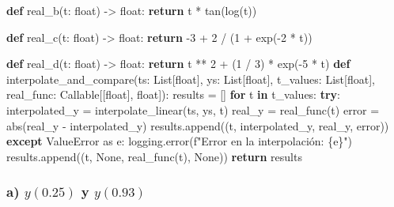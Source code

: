 \documentclass[
  letterpaper,
  DIV=11,
  numbers=noendperiod]{scrartcl}
\newenvironment{Shaded}{\begin{snugshade}}{\end{snugshade}}
\newcommand{\BuiltInTok}[1]{\textcolor[rgb]{0.00,0.23,0.31}{#1}}
\newcommand{\ControlFlowTok}[1]{\textcolor[rgb]{0.00,0.23,0.31}{\textbf{#1}}}
\newcommand{\DecValTok}[1]{\textcolor[rgb]{0.68,0.00,0.00}{#1}}
\newcommand{\ImportTok}[1]{\textcolor[rgb]{0.00,0.46,0.62}{#1}}
\newcommand{\KeywordTok}[1]{\textcolor[rgb]{0.00,0.23,0.31}{\textbf{#1}}}
\newcommand{\NormalTok}[1]{\textcolor[rgb]{0.00,0.23,0.31}{#1}}
\newcommand{\OperatorTok}[1]{\textcolor[rgb]{0.37,0.37,0.37}{#1}}
\newcommand{\PreprocessorTok}[1]{\textcolor[rgb]{0.68,0.00,0.00}{#1}}
\newcommand{\SpecialCharTok}[1]{\textcolor[rgb]{0.37,0.37,0.37}{#1}}
\newcommand{\SpecialStringTok}[1]{\textcolor[rgb]{0.13,0.47,0.30}{#1}}
\newcommand{\VariableTok}[1]{\textcolor[rgb]{0.07,0.07,0.07}{#1}}
\begin{document}
\begin{Shaded}
\begin{Highlighting}[]
\KeywordTok{def}\NormalTok{ real\_b(t: }\BuiltInTok{float}\NormalTok{) }\OperatorTok{{-}\textgreater{}} \BuiltInTok{float}\NormalTok{:}
    \ControlFlowTok{return}\NormalTok{ t }\OperatorTok{*}\NormalTok{ tan(log(t))}

\KeywordTok{def}\NormalTok{ real\_c(t: }\BuiltInTok{float}\NormalTok{) }\OperatorTok{{-}\textgreater{}} \BuiltInTok{float}\NormalTok{:}
    \ControlFlowTok{return} \OperatorTok{{-}}\DecValTok{3} \OperatorTok{+} \DecValTok{2} \OperatorTok{/}\NormalTok{ (}\DecValTok{1} \OperatorTok{+}\NormalTok{ exp(}\OperatorTok{{-}}\DecValTok{2} \OperatorTok{*}\NormalTok{ t))}

\KeywordTok{def}\NormalTok{ real\_d(t: }\BuiltInTok{float}\NormalTok{) }\OperatorTok{{-}\textgreater{}} \BuiltInTok{float}\NormalTok{:}
    \ControlFlowTok{return}\NormalTok{ t }\OperatorTok{**} \DecValTok{2} \OperatorTok{+}\NormalTok{ (}\DecValTok{1} \OperatorTok{/} \DecValTok{3}\NormalTok{) }\OperatorTok{*}\NormalTok{ exp(}\OperatorTok{{-}}\DecValTok{5} \OperatorTok{*}\NormalTok{ t)}
\KeywordTok{def}\NormalTok{ interpolate\_and\_compare(ts: List[}\BuiltInTok{float}\NormalTok{], ys: List[}\BuiltInTok{float}\NormalTok{], t\_values: List[}\BuiltInTok{float}\NormalTok{], real\_func: Callable[[}\BuiltInTok{float}\NormalTok{], }\BuiltInTok{float}\NormalTok{]):}
\NormalTok{    results }\OperatorTok{=}\NormalTok{ []}
    \ControlFlowTok{for}\NormalTok{ t }\KeywordTok{in}\NormalTok{ t\_values:}
        \ControlFlowTok{try}\NormalTok{:}
\NormalTok{            interpolated\_y }\OperatorTok{=}\NormalTok{ interpolate\_linear(ts, ys, t)}
\NormalTok{            real\_y }\OperatorTok{=}\NormalTok{ real\_func(t)}
\NormalTok{            error }\OperatorTok{=} \BuiltInTok{abs}\NormalTok{(real\_y }\OperatorTok{{-}}\NormalTok{ interpolated\_y)}
\NormalTok{            results.append((t, interpolated\_y, real\_y, error))}
        \ControlFlowTok{except} \PreprocessorTok{ValueError} \ImportTok{as}\NormalTok{ e:}
\NormalTok{            logging.error(}\SpecialStringTok{f"Error en la interpolación: }\SpecialCharTok{\{}\NormalTok{e}\SpecialCharTok{\}}\SpecialStringTok{"}\NormalTok{)}
\NormalTok{            results.append((t, }\VariableTok{None}\NormalTok{, real\_func(t), }\VariableTok{None}\NormalTok{))}
    \ControlFlowTok{return}\NormalTok{ results}
\end{Highlighting}
\end{Shaded}

\subsubsection{\texorpdfstring{a) \(y(0.25)\) y
\(y(0.93)\)}{a) y(0.25) y y(0.93)}}\label{a-y0.25-y-y0.93}
\end{document}
